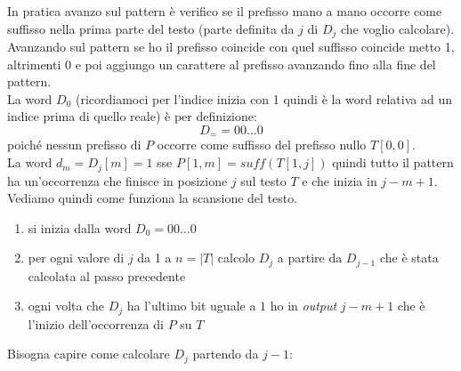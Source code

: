 In pratica avanzo sul pattern è verifico se il prefisso mano a mano occorre come
suffisso nella prima parte del testo (parte definita da $j$ di $D_j$ che voglio
calcolare). Avanzando sul pattern se ho il prefisso coincide con quel suffisso
coincide metto 1, altrimenti 0 e poi aggiungo un carattere al prefisso avanzando
fino alla fine del pattern.\\
La word $D_0$ (ricordiamoci per l'indice inizia con 1 quindi è la word
relativa ad un indice prima di quello reale) è per definizione:
\[D_==00\ldots 0\]
poiché nessun prefisso di $P$ occorre come suffisso del prefisso nullo
$T[0,0]$.\\
La word $d_m=D_j[m]=1$ sse $P[1,m]=suff(T[1,j])$ quindi tutto il pattern ha
un'occorrenza che finisce in posizione $j$ sul testo $T$ e che inizia in
$j-m+1$.\\
Vediamo quindi come funziona la scansione del testo.\\
\begin{enumerate}
  \item si inizia dalla word $D_0=00\ldots0$
  \item per ogni valore di $j$ da 1 a $n=|T|$ calcolo $D_j$ a partire da
  $D_{j-1}$ che è stata calcolata al passo precedente
  \item ogni volta che $D_j$ ha l'ultimo bit uguale a $1$ ho in \textit{output} $j-m+1$
  che è l'inizio dell'occorrenza di $P$ su $T$
\end{enumerate}
Bisogna capire come calcolare $D_j$ partendo da $j-1$:
